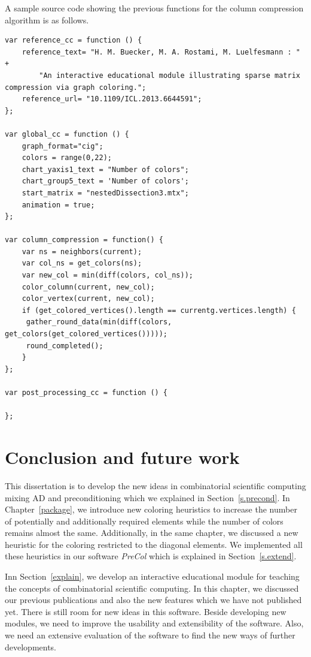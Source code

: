 \documentclass[12pt, twoside,a4paper,toc=bibliography]{scrbook}
\newcommand{\secref}[1]{Section~\protect\ref{#1}}
\begin{document}
A sample source code showing the previous functions for the column compression algorithm is as follows.
\begin{lstlisting}
var reference_cc = function () {
    reference_text= "H. M. Buecker, M. A. Rostami, M. Luelfesmann : " +
        "An interactive educational module illustrating sparse matrix compression via graph coloring.";
    reference_url= "10.1109/ICL.2013.6644591";
};

var global_cc = function () {
    graph_format="cig";
    colors = range(0,22);
    chart_yaxis1_text = "Number of colors";
    chart_group5_text = 'Number of colors';
    start_matrix = "nestedDissection3.mtx";
    animation = true;
};

var column_compression = function() {
    var ns = neighbors(current);
    var col_ns = get_colors(ns);
    var new_col = min(diff(colors, col_ns));
    color_column(current, new_col);
    color_vertex(current, new_col);
    if (get_colored_vertices().length == currentg.vertices.length) {
     gather_round_data(min(diff(colors, get_colors(get_colored_vertices()))));
     round_completed();
    }
};

var post_processing_cc = function () {

};
\end{lstlisting}

\chapter{Conclusion and future work}
\label{conc}
This dissertation is to develop the new ideas in combinatorial scientific computing mixing AD and preconditioning which we explained in \secref{s.precond}.
In Chapter~\ref{package}, we introduce new coloring heuristics
to increase the number of potentially and additionally required elements
while the number of colors remains almost the same.
Additionally, in the same chapter,
we discussed a new heuristic for the coloring restricted to the diagonal elements.
We implemented all these heuristics in our software \textit{PreCol} which
is explained in \secref{s.extend}.

Inn \secref{explain}, we develop an interactive educational module
for teaching the concepts of combinatorial scientific computing.
In this chapter, we discussed our previous publications
\cite{2013:05,2014:01,2014:02,2014:09,2015:3} and also the new features which
we have not published yet. There is still room
for new ideas in this software. Beside developing new modules,
we need to improve the usability and extensibility of the software.
Also, we need an extensive evaluation of the software to find
the new ways of further developments.
\end{document}
